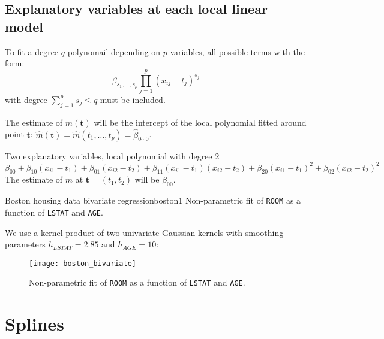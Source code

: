 \subsection{Explanatory variables at each local linear model}

To fit a degree $q$ polynomail depending on $p$-variables, all possible terms with the form:
\begin{equation*}
    \beta_{s_1, \ldots, s_p} \prod_{j=1}^p \left(
        x_{ij} - t_j
    \right)^{s_j}
\end{equation*}
with degree $\sum_{j=1}^p s_j \leq q$ must be included.

The estimate of $m(\boldsymbol t)$ will be the intercept of the local polynomial
fitted around point $\boldsymbol t$: $\hat m(\boldsymbol t) = \hat m(t_1, \ldots, t_p) = \hat \beta_{0\cdots 0}$.

\begin{example}{Two explanatory variables, local polynomial with degree 2}{}
    \begin{equation*}
        \beta_{00} + \beta_{10} (x_{i1} - t_1)
        + \beta_{01} (x_{i2} - t_2)
        + \beta_{11} (x_{i1} - t_1)(x_{i2} - t_2)
        + \beta_{20} (x_{i1} - t_1)^2
        + \beta_{02} (x_{i2} - t_2)^2
    \end{equation*}
    \tcblower
    The estimate of $m$ at $\boldsymbol t = (t_1, t_2)$ will be $\beta_{00}$.
\end{example}

\begin{example}{Boston housing data bivariate regression}{boston1}
    Non-parametric fit of \texttt{ROOM} as a function of \texttt{LSTAT}
    and \texttt{AGE}.

    We use a kernel product of two univariate Gaussian kernels with
    smoothing parameters $h_{LSTAT} = 2.85$ and $h_{AGE} = 10$:

    \begin{figure}[H]
        \texttt{[image: boston\_bivariate]}
        \caption{Non-parametric fit of \texttt{ROOM} as a function of \texttt{LSTAT} and \texttt{AGE}.}
    \end{figure}
\end{example}

\pagebreak
\section{Splines}

